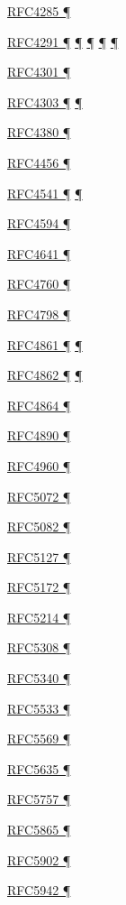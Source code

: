 \documentclass[
]{article}
\begin{document}
\hyperref[obsolete-features-in-ipv6]{RFC4285 ¶}

\hyperref[address-resolution]{RFC4291 ¶} \hyperref[addresses]{¶}
\hyperref[filtering]{¶} \hyperref[obsolete-features-in-ipv6]{¶}
\hyperref[markdown-usage]{¶}

\hyperref[security]{RFC4301 ¶}

\hyperref[extension-headers-and-options]{RFC4303 ¶}
\hyperref[packet-format]{¶}

\hyperref[obsolete-techniques]{RFC4380 ¶}

\hyperref[routing]{RFC4456 ¶}

\hyperref[address-resolution]{RFC4541 ¶}
\hyperref[layer-2-considerations]{¶}

\hyperref[traffic-class-and-flow-label]{RFC4594 ¶}

\hyperref[filtering]{RFC4641 ¶}

\hyperref[routing]{RFC4760 ¶}

\hyperref[tunnels]{RFC4798 ¶}

\hyperref[address-resolution]{RFC4861 ¶}
\hyperref[auto-configuration]{¶}

\hyperref[auto-configuration]{RFC4862 ¶}
\hyperref[address-and-prefix-management]{¶}

\hyperref[topology-obfuscation]{RFC4864 ¶}

\hyperref[filtering]{RFC4890 ¶}

\hyperref[transport-protocols]{RFC4960 ¶}

\hyperref[layer-2-functions]{RFC5072 ¶}

\hyperref[filtering]{RFC5082 ¶}

\hyperref[traffic-class-and-flow-label]{RFC5127 ¶}

\hyperref[layer-2-functions]{RFC5172 ¶}

\hyperref[obsolete-techniques]{RFC5214 ¶}

\hyperref[routing]{RFC5308 ¶}

\hyperref[routing]{RFC5340 ¶}

\hyperref[multihoming]{RFC5533 ¶}

\hyperref[obsolete-techniques]{RFC5569 ¶}

\hyperref[filtering]{RFC5635 ¶}

\hyperref[address-resolution]{RFC5757 ¶}

\hyperref[traffic-class-and-flow-label]{RFC5865 ¶}

\hyperref[translation-and-ipv4-as-a-service]{RFC5902 ¶}

\hyperref[auto-configuration]{RFC5942 ¶}
\end{document}
